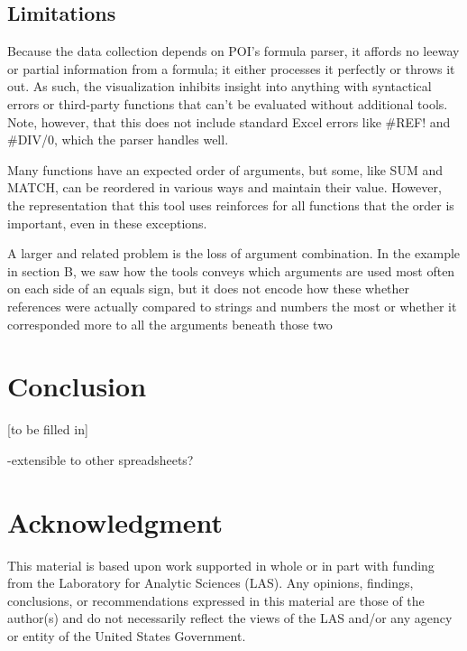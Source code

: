 \documentclass[conference]{IEEEtran}
\begin{document}
\subsection{Limitations}
Because the data collection depends on POI's formula parser, it affords no leeway or partial information from a formula; it either processes it perfectly or throws it out. As such, the visualization inhibits insight into anything with syntactical errors or third-party functions that can't be evaluated without additional tools. Note, however, that this does not include standard Excel errors like \#REF! and \#DIV/0, which the parser handles well. \par
Many functions have an expected order of arguments, but some, like SUM and MATCH, can be reordered in various ways and maintain their value. However, the representation that this tool uses reinforces for all functions that the order is important, even in these exceptions. \par
A larger and related problem is the loss of argument combination. In the example in section B, we saw how the tools conveys which arguments are used most often on each side of an equals sign, but it does not encode how these whether references were actually compared to strings and numbers the most or whether it corresponded more to all the arguments beneath those two 

\section{Conclusion}

[to be filled in]

-extensible to other spreadsheets?


\section*{Acknowledgment}
This material is based upon work supported in whole or in part with funding from the Laboratory for Analytic Sciences (LAS). Any opinions, findings, conclusions, or recommendations expressed in this material are those of the author(s) and do not necessarily reflect the views of the LAS and/or any agency or entity of the United States Government.

\end{document}
